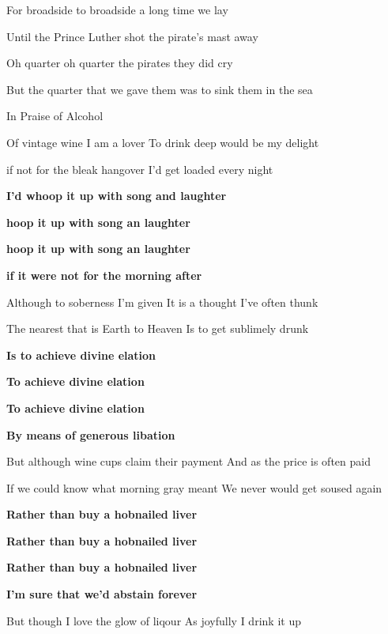 \documentclass[letterpaper,9pt]{article}
\begin{document}
\hfill

For broadside to broadside a long time we lay

Until the Prince Luther shot the pirate’s mast away

\hfill

Oh quarter oh quarter the pirates they did cry

But the quarter that we gave them was to sink them in the sea

\newpage
{}
\huge
In Praise of Alcohol

\Large
\hfill

Of vintage wine I am a lover To drink deep would be my delight

if not for the bleak hangover I'd get loaded every night

\hfill

\textbf{I'd whoop it up with song and laughter
}

\textbf{hoop it up with song an laughter
}

\textbf{hoop it up with song an laughter
}

\textbf{if it were not for the morning after}

\hfill

Although to soberness I'm given It is a thought I've often thunk

The nearest that is Earth to Heaven Is to get sublimely drunk

\hfill

\textbf{Is to achieve divine elation
}

\textbf{To achieve divine elation
}

\textbf{To achieve divine elation
}

\textbf{By means of generous libation}

\hfill

But although wine cups claim their payment And as the price is often paid

If we could know what morning gray meant We never would get soused again

\hfill

\textbf{Rather than buy a hobnailed liver
}

\textbf{Rather than buy a hobnailed liver
}

\textbf{Rather than buy a hobnailed liver
}

\textbf{I'm sure that we'd abstain forever}

\hfill

But though I love the glow of liqour As joyfully I drink it up
\end{document}
